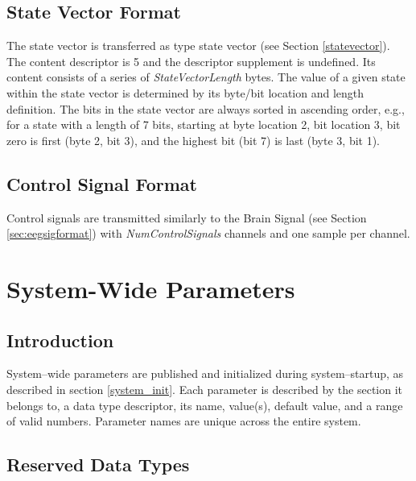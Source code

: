 \documentclass[letterpaper,oneside,12pt]{book}
\begin{document}
\subsection{State Vector Format}
\label{statevector_format}

The state vector is transferred as type state vector (see Section 
\ref{statevector}). The content descriptor is 5 and the descriptor supplement is 
undefined. Its content consists of a series of \textit{StateVectorLength} bytes. 
The value of a given state within the state vector is determined by its byte/bit 
location and length definition. The bits in the state vector are always sorted 
in ascending order, e.g., for a state with a length of 7 bits, starting at byte 
location 2, bit location 3, bit zero is first (byte 2, bit 3), and the highest 
bit (bit 7) is last (byte 3, bit 1).

\subsection{Control Signal Format}

Control signals are transmitted similarly to the Brain Signal (see Section 
\ref{sec:eegsigformat}) with \textit{NumControlSignals} channels and one sample 
per channel.


\section{System-Wide Parameters}
\label{system_params}

\subsection{Introduction}

System--wide parameters are published and initialized during system--startup, as 
described in section \ref{system_init}. Each parameter is described by the 
section it belongs to, a data type descriptor, its name, value(s), default 
value, and a range of valid numbers. Parameter names are unique across the 
entire system.

\subsection{Reserved Data Types}

\vspace{.5cm}
\end{document}
